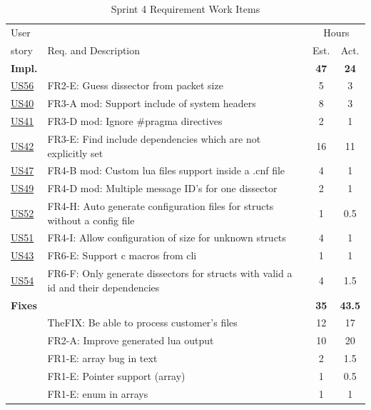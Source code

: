\begin{table}[htbp] \small \center
\caption{Sprint 4 Requirement Work Items \label{tab:sprint4req}}
\begin{tabularx}{\textwidth}{l X c c}
	\toprule
	User & & \multicolumn{2}{c}{Hours} \\
	\cmidrule(r){3-4}
	story & Req. and Description & Est. & Act. \\
	\midrule
	\textbf{Impl.} &  & \textbf{47} & \textbf{24} \\
	\hyperref[tab:req:stories13]{US56} & FR2-E: Guess \gls{dissector} from \gls{packet} size & 5 & 3 \\
 	\hyperref[tab:req:stories10]{US40} & FR3-A mod: Support \gls{include} of system \glspl{header} &  8  & 3 \\
	\hyperref[tab:req:stories10]{US41} & FR3-D mod: Ignore \#pragma directives & 2 & 1 \\
	\hyperref[tab:req:stories10]{US42} & FR3-E: Find include dependencies which are not explicitly set & 16  & 11 \\
	\hyperref[tab:req:stories11]{US47} & FR4-B mod: Custom \Gls{lua} files support inside a .cnf file & 4 & 1 \\
	\hyperref[tab:req:stories12]{US49} & FR4-D mod: Multiple message ID's for one \gls{dissector} & 2 & 1 \\
	\hyperref[tab:req:stories12]{US52} & FR4-H: Auto generate configuration files for \glspl{struct} without a config file & 1  & 0.5\\
	\hyperref[tab:req:stories12]{US51} & FR4-I: Allow configuration of size for unknown \glspl{struct} & 4 & 1 \\
	\hyperref[tab:req:stories10]{US43} & FR6-E: Support \Gls{c} macros from \gls{cli} & 1 & 1 \\
	\hyperref[tab:req:stories12]{US54} & FR6-F: Only generate \glspl{dissector} for \glspl{struct} with valid a id and their dependencies & 4 & 1.5 \\
	\addlinespace
	\textbf{Fixes} &  & \textbf{35} & \textbf{43.5} \\
	& TheFIX: Be able to process customer's files & 12 & 17 \\
	 & FR2-A: Improve generated \Gls{lua} output & 10 & 20 \\
	 & FR1-E: \Gls{array} bug in text & 2 & 1.5 \\
	 & FR1-E: Pointer support (array) & 1 & 0.5 \\
	 & FR1-E: \Gls{enum} in \glspl{array} & 1 & 1 \\		

\end{tabularx}
\end{table}
